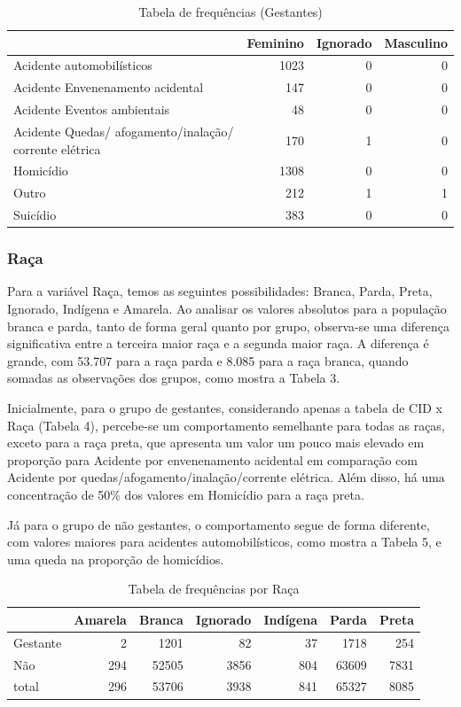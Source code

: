 \documentclass[
]{article}
\begin{document}
\begin{table}

\caption{\label{tab:unnamed-chunk-4}Tabela de frequências (Gestantes)}
\centering
\begin{tabular}[t]{l|r|r|r}
\hline
  & Feminino & Ignorado & Masculino\\
\hline
Acidente automobilísticos & 1023 & 0 & 0\\
\hline
Acidente Envenenamento acidental & 147 & 0 & 0\\
\hline
Acidente Eventos ambientais & 48 & 0 & 0\\
\hline
Acidente Quedas/ afogamento/inalação/ corrente elétrica & 170 & 1 & 0\\
\hline
Homicídio & 1308 & 0 & 0\\
\hline
Outro & 212 & 1 & 1\\
\hline
Suicídio & 383 & 0 & 0\\
\hline
\end{tabular}
\end{table}

\hypertarget{rauxe7a}{%
\subsubsection{Raça}\label{rauxe7a}}

Para a variável Raça, temos as seguintes possibilidades: Branca, Parda,
Preta, Ignorado, Indígena e Amarela. Ao analisar os valores absolutos
para a população branca e parda, tanto de forma geral quanto por grupo,
observa-se uma diferença significativa entre a terceira maior raça e a
segunda maior raça. A diferença é grande, com 53.707 para a raça parda e
8.085 para a raça branca, quando somadas as observações dos grupos, como
mostra a Tabela 3.

Inicialmente, para o grupo de gestantes, considerando apenas a tabela de
CID x Raça (Tabela 4), percebe-se um comportamento semelhante para todas
as raças, exceto para a raça preta, que apresenta um valor um pouco mais
elevado em proporção para Acidente por envenenamento acidental em
comparação com Acidente por quedas/afogamento/inalação/corrente
elétrica. Além disso, há uma concentração de 50\% dos valores em
Homicídio para a raça preta.

Já para o grupo de não gestantes, o comportamento segue de forma
diferente, com valores maiores para acidentes automobilísticos, como
mostra a Tabela 5, e uma queda na proporção de homicídios.

\begin{table}

\caption{\label{tab:unnamed-chunk-5}Tabela de frequências por Raça}
\centering
\begin{tabular}[t]{l|r|r|r|r|r|r}
\hline
  & Amarela & Branca & Ignorado & Indígena & Parda & Preta\\
\hline
Gestante & 2 & 1201 & 82 & 37 & 1718 & 254\\
\hline
Não & 294 & 52505 & 3856 & 804 & 63609 & 7831\\
\hline
total & 296 & 53706 & 3938 & 841 & 65327 & 8085\\
\hline
\end{tabular}
\end{table}
\end{document}

